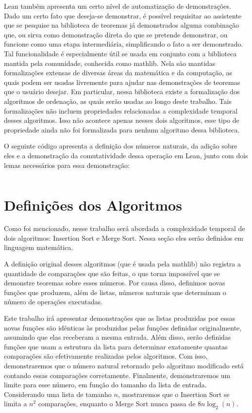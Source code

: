 \documentclass[12pt, oneside, a4paper,english,brazil]{abntex2}
\begin{document}
\qquad Lean tamb\'em apresenta um certo n\'ivel de automatiza\c{c}\~ao de demonstra\c{c}\~oes. Dado um certo fato
que deseja-se demonstrar, \'e poss\'ivel requisitar ao assistente que se pesquise na biblioteca de teoremas j\'a
demonstrados alguma combina\c{c}\~ao que, ou sirva como demonstra\c{c}\~ao direta do que se pretende demonstrar,
ou funcione como uma etapa intermedi\'aria, simplificando o fato a ser demonstrado. Tal funcionalidade \'e
especialmente \'util se usada em conjunto com a biblioteca mantida pela comunidade, conhecida como
mathlib\cite{3}. Nela s\~ao mantidas formaliza\c{c}\~oes extensas de diversas \'areas da matem\'atica e da
computa\c{c}\~ao, as quais podem ser usadas livremente para ajudar nas demonstra\c{c}\~oes de teoremas que o
usu\'ario desejar. Em particular, nessa biblioteca existe a formaliza\c{c}\~ao dos algoritmos de ordena\c{c}\~ao,
as quais ser\~ao usadas ao longo deste trabalho. Tais formaliza\c{c}\~oes
n\~ao incluem propriedades relacionadas a complexidade temporal desses algoritmos. Isso n\~ao acontece
apenas nesses dois algoritmos,
esse tipo de propriedade ainda n\~ao foi formalizada para nenhum algoritmo dessa biblioteca.

\qquad O seguinte c\'odigo apresenta a defini\c{c}\~ao dos n\'umeros naturais, da adi\c{c}\~ao sobre eles e a
demonstra\c{c}\~ao da comutatividade dessa opera\c{c}\~ao em Lean, junto com dois lemas necess\'arios para essa
demonstra\c{c}\~ao:
\newpage

\inputminted{lean}{add.lean}

\chapter{Defini\c{c}\~oes dos Algoritmos}

\qquad Como foi mencionado, nesse trabalho ser\'a abordada a complexidade
temporal de dois algoritmos: Insertion Sort e Merge Sort. Nessa se\c{c}\~ao
eles ser\~ao definidos em linguagem matem\'atica.

\qquad A defini\c{c}\~ao original desses algoritmos (que \'e usada pela mathlib)
n\~ao registra a quantidade de compara\c{c}\~oes que
s\~ao feitas, o que torna imposs\'ivel que se demonstre
teoremas sobre esses n\'umeros. Por causa
disso, definimos novas fun\c{c}\~oes que produzem, al\'em de listas,
n\'umeros naturais que determinam o n\'umero de opera\c{c}\~oes executadas.

\qquad Este trabalho ir\'a apresentar demonstra\c{c}\~oes que as listas
produzidas por essas novas fun\c{c}\~oes s\~ao id\^enticas \`as produzidas pelas
fun\c{c}\~oes definidas originalmente, assumindo que elas receberam a mesma entrada. Al\'em
disso, ser\~ao definidas fun\c{c}\~oes que usam a estrutura da lista para
determinar exatamente quantas compara\c{c}\~oes s\~ao efetivamente realizadas
pelos algoritmos. Com isso, demonstraremos que o n\'umero natural retornado pelo
algoritmo modificado est\'a contando essas compara\c{c}\~oes corretamente. Finalmente,
demonstraremos um limite para esse n\'umero, em fun\c{c}\~ao do tamanho da lista de entrada.
Considerando uma lista de tamanho $n$, mostraremos que o Insertion Sort se limita a $n^{2}$
compara\c{c}\~oes, enquanto o Merge Sort nunca passa de $8 n \log_{2} (n)$.
\end{document}
